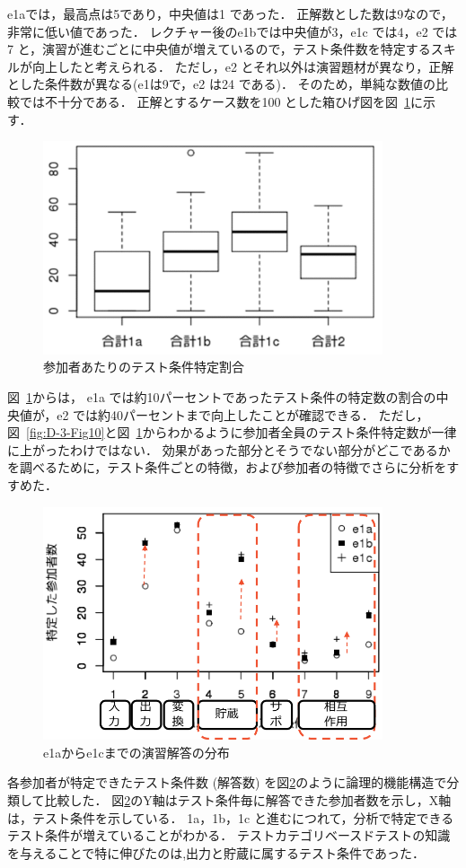 e1aでは，最高点は5であり，中央値は1 であった．
正解数とした数は9なので，非常に低い値であった．
レクチャー後のe1bでは中央値が3，e1c では4，e2 では7 と，演習が進むごとに中央値が増えているので，テスト条件数を特定するスキルが向上したと考えられる．
ただし，e2 とそれ以外は演習題材が異なり，正解とした条件数が異なる(e1は9で，e2 は24 である)．
そのため，単純な数値の比較では不十分である．
正解とするケース数を100 とした箱ひげ図を図~\ref{fig:D-3-Fig11}に示す．
\begin{figure}[htbp]
  \begin{center}
  \includegraphics[width=10cm]{./image/D-3-Fig11.png}
  \caption{参加者あたりのテスト条件特定割合}
  \label{fig:D-3-Fig11}
  \end{center}
   \end{figure}

図~\ref{fig:D-3-Fig11}からは， e1a では約10パーセントであったテスト条件の特定数の割合の中央値が，e2 では約40パーセントまで向上したことが確認できる．
ただし，図~\ref{fig:D-3-Fig10}と図~\ref{fig:D-3-Fig11}からわかるように参加者全員のテスト条件特定数が一律に上がったわけではない．
効果があった部分とそうでない部分がどこであるかを調べるために，テスト条件ごとの特徴，および参加者の特徴でさらに分析をすすめた．

\begin{figure}[htbp]
  \begin{center}
  \includegraphics[width=10cm]{./image/D-3-Fig12-1.png}
  \caption{e1aからe1cまでの演習解答の分布}
  \label{fig:D-3-Fig12-1}
  \end{center}
\end{figure}
各参加者が特定できたテスト条件数 (解答数) を図\ref{fig:D-3-Fig12-1}のように論理的機能構造で分類して比較した．
図\ref{fig:D-3-Fig12-1}のY軸はテスト条件毎に解答できた参加者数を示し，X軸は，テスト条件を示している．
1a，1b，1c と進むにつれて，分析で特定できるテスト条件が増えていることがわかる．
テストカテゴリベースドテストの知識を与えることで特に伸びたのは,出力と貯蔵に属するテスト条件であった．

